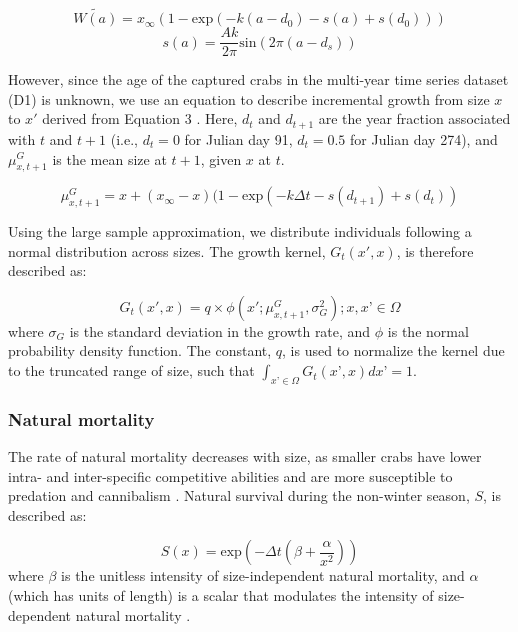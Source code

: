 \documentclass{article}
\begin{document}
\begin{equation}
\widetilde{W(a)} = x_{\infty}(1-\text{exp}(-k(a-d_0) - s(a) + s(d_0)))
\end{equation}
\begin{equation}
s(a) = \frac{Ak}{2\pi} \text{sin}(2\pi(a-d_s)) 
\end{equation}

However, since the age of the captured crabs in the multi-year time series dataset (D1) is unknown, we use an equation to describe incremental growth from size $x$ to $x'$ derived from Equation 3 \parencite{white2016fitting}. Here, $d_t$ and $d_{t+1}$ are the year fraction associated with $t$ and $t+1$ (i.e., $d_t = 0$ for Julian day 91, $d_t = 0.5$ for Julian day 274), and $\mu^G_{x,t+1}$ is the mean size at $t+1$, given $x$ at $t$.

\begin{equation}
\mu^G_{x,t+1} = x + (x_{\infty}-x)(1-\text{exp}(-k\Delta t-s(d_{t+1})+s(d_t))
\end{equation}

Using the large sample approximation, we distribute individuals following a normal distribution across sizes. The growth kernel, $G_t(x',x)$, is therefore described as:

\begin{equation}
G_t(x',x) = q\times\phi(x'; \mu^G_{x, t+1}, \sigma_G^2) ; x, x’ \in \Omega
\end{equation}
where $\sigma_G$ is the standard deviation in the growth rate, and $\phi$ is the normal probability density function. The constant, $q$, is used to normalize the kernel due to the truncated range of size, such that $\int_{x’ \in \Omega}  G_t(x’, x) dx’ = 1$.

\subsubsection*{Natural mortality}

The rate of natural mortality decreases with size, as smaller crabs have lower intra- and inter-specific competitive abilities and are more susceptible to predation and cannibalism \parencite{maszczyk2018body, grosholz2021stage}. Natural survival during the non-winter season, $S$, is described as: 

\begin{equation}
S(x) = \text{exp}\left(-\Delta t(\beta+\frac{\alpha}{x^2})\right)
\end{equation}
where $\beta$ is the unitless intensity of size-independent natural mortality, and $\alpha$ (which has units of length) is a scalar that modulates the intensity of size-dependent natural mortality \parencite{carlson2010bayesian}. 
\end{document}
